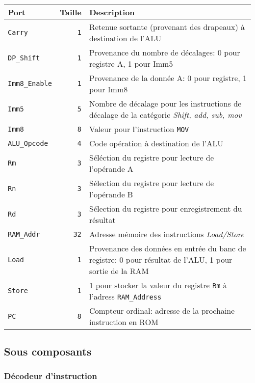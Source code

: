 \begin{tabular}{|l|r|l|}
\hline 
\textbf{Port} & \textbf{Taille} & \textbf{Description}\\
\hline

\hline
\texttt{Carry}		&  \texttt{1} & Retenue sortante (provenant des drapeaux) à destination de l'ALU\\
\hline
\texttt{DP\_Shift}	&  \texttt{1} & Provenance du nombre de décalages: 0 pour registre A, 1 pour Imm5 \\
\hline
\texttt{Imm8\_Enable}	&  \texttt{1} & Provenance de la donnée A: 0 pour registre, 1 pour Imm8\\
\hline
\texttt{Imm5}		&  \texttt{5} & Nombre de décalage pour les instructions de décalage de la catégorie \textit{Shift, add, sub, mov}\\
\hline
\texttt{Imm8}		&  \texttt{8} & Valeur pour l'instruction \texttt{MOV}\\
\hline
\texttt{ALU\_Opcode}	&  \texttt{4} & Code opération à destination de l'ALU\\
\hline
\texttt{Rm}		&  \texttt{3} & Séléction du registre pour lecture de l'opérande A\\
\hline
\texttt{Rn}		&  \texttt{3} & Sélection du registre pour lecture de l'opérande B\\
\hline
\texttt{Rd}		&  \texttt{3} & Sélection du registre pour enregistrement du résultat\\
\hline
\texttt{RAM\_Addr}	& \texttt{32} & Adresse mémoire des instructions \textit{Load/Store}\\
\hline
\texttt{Load}		&  \texttt{1} & Provenance des données en entrée du banc de registre: 0 pour résultat de l'ALU, 1 pour sortie de la RAM\\
\hline
\texttt{Store}		&  \texttt{1} & 1 pour stocker la valeur du registre \texttt{Rm} à l'adress \texttt{RAM\_Address}\\
\hline
\texttt{PC}		&  \texttt{8} & Compteur ordinal: adresse de la prochaine instruction en ROM\\


\hline
\end{tabular}

\subsection{Sous composants}

\subsubsection{Décodeur d'instruction}

